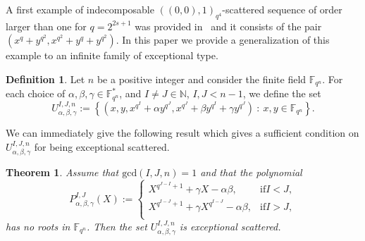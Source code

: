 \documentclass[11pt]{article}
\newtheorem{theorem}[theo]{Theorem}
\theoremstyle{definition}
\newtheorem{defi}[theo]{Definition}
\numberwithin{equation}{section}
\begin{document}
A first example of indecomposable $((0,0),1)_{q^4}$-scattered sequence of order larger than one for $q=2^{2s+1}$ was provided in~\cite{BMN2022} and it consists of the pair $(x^q+y^{q^2},x^{q^2}+y^q+y^{q^2})$. 
In this paper we provide a generalization of this example to an infinite family of exceptional type.

\begin{defi}
\label{defn:sets}
Let $n$ be a positive integer and consider the finite field $\mathbb{F}_{q^n}$. For each choice of $\alpha,\beta,\gamma \in \mathbb{F}_{q^n}^*$, and $I\neq J\in \mathbb{N}$, $I,J<n-1$,  we define the set
\begin{equation*}
        U_{\alpha, \beta, \gamma}^{I,J,n}:=\left\{\left(x,y,x^{q^I}+\alpha y^{q^J},x^{q^J}+\beta y^{q^I} + \gamma y^{q^J}\right) \ : \ x,y\in \mathbb{F}_{q^n}\right\}.
\end{equation*}
\end{defi}

We can immediately give the following result which gives a sufficient condition on $U_{\alpha, \beta, \gamma}^{I,J,n}$ for being exceptional scattered.

\begin{theorem}
\label{thm:scattered:1}
Assume that $\mathrm{gcd}(I,J,n)=1$ and that the polynomial 
\begin{equation}\label{Eq:P}
    P^{I,J}_{\alpha,\beta,\gamma}(X):=\begin{cases}
    X^{q^{J-I}+1} + \gamma X - \alpha\beta,& \mathrm{if } I<J,\\ 
     X^{q^{I-J}+1} + \gamma X^{q^{I-J}} - \alpha\beta,& \mathrm{if } I>J,\\
    \end{cases}
\end{equation}
has no roots in $\mathbb{F}_{q^n}$. Then the set $U_{\alpha, \beta, \gamma}^{I,J,n}$ is exceptional scattered.
\end{theorem}
\end{document}
